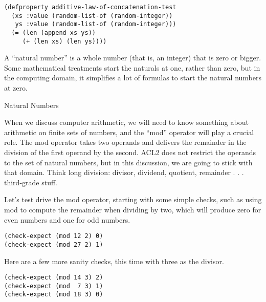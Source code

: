 \label{additive-lengths-test}
\begin{Verbatim}
(defproperty additive-law-of-concatenation-test
  (xs :value (random-list-of (random-integer))
   ys :value (random-list-of (random-integer)))
  (= (len (append xs ys))
     (+ (len xs) (len ys))))
\end{Verbatim}

\begin{aside}
A ``natural number'' is a whole number (that is, an integer)
that is zero or bigger.
Some mathematical treatments start the naturals at one,
rather than zero, but in the computing domain,
it simplifies a lot of formulas to start the natural numbers at zero.
\caption{Natural Numbers}
\label{natural-number-def}
\end{aside}

When we discuss computer arithmetic, we will need to know something about
arithmetic on finite sets of numbers, and the ``mod'' operator will play a crucial role.
\label{mod-function}
The mod operator takes two operands and
delivers the remainder in the division of the first operand by the second.
ACL2 does not restrict the operands to the set of natural numbers,
but in this discussion, we are going to stick with that domain.
Think long division: divisor, dividend, quotient,
remainder . . . third-grade stuff.

Let's test drive the mod operator, starting with
some simple checks, such as using mod
to compute the remainder when dividing by two,
which will produce zero for even numbers and one for odd numbers.

\begin{Verbatim}
(check-expect (mod 12 2) 0)
(check-expect (mod 27 2) 1)
\end{Verbatim}

Here are a few more sanity checks, this time with three as the divisor.

\begin{Verbatim}
(check-expect (mod 14 3) 2)
(check-expect (mod  7 3) 1)
(check-expect (mod 18 3) 0)
\end{Verbatim}

